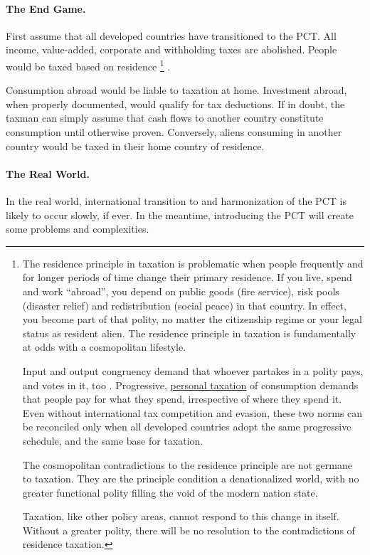 \paragraph{The End Game.} First assume that all developed countries have transitioned to the PCT.
All income, value-added, corporate and withholding taxes are abolished.
People would be taxed based on residence \citep[1645]{Graetz2009}
\footnote{
	The residence principle in taxation is problematic when people frequently and for longer periods of time change their primary residence.
	If you live, spend and work ``abroad'', you depend on public goods (fire service), risk pools (disaster relief) and redistribution (social peace) in that country.
	In effect, you become part of that polity, no matter the citizenship regime or your legal status as resident alien.
	The residence principle in taxation is fundamentally at odds with a cosmopolitan lifestyle.

	Input and output congruency demand that whoever partakes in a polity pays, and votes in it, too \citep{Zurn-2000-aa}.
	Progressive, \hyperref[des:PersonalTaxation]{personal taxation} of consumption demands that people pay for what they spend, irrespective of where they spend it.
	Even without international tax competition and evasion, these two norms can be reconciled only when all developed countries adopt the same progressive schedule, and the same base for taxation.

	The cosmopolitan contradictions to the residence principle are not germane to taxation.
	They are the principle condition a denationalized world, with no greater functional polity filling the void of the modern nation state.

	Taxation, like other policy areas, cannot respond to this change in itself.
	Without a greater polity, there will be no resolution to the contradictions of residence taxation.
}
.

Consumption abroad would be liable to taxation at home.
Investment abroad, when properly documented, would qualify for tax deductions.
If in doubt, the taxman can simply assume that cash flows to another country constitute consumption until otherwise proven.
Conversely, aliens consuming in another country would be taxed in their home country of residence.

\paragraph{The Real World.} In the real world, international transition to and harmonization of the PCT is likely to occur slowly, if ever.
In the meantime, introducing the PCT will create some problems and complexities.

